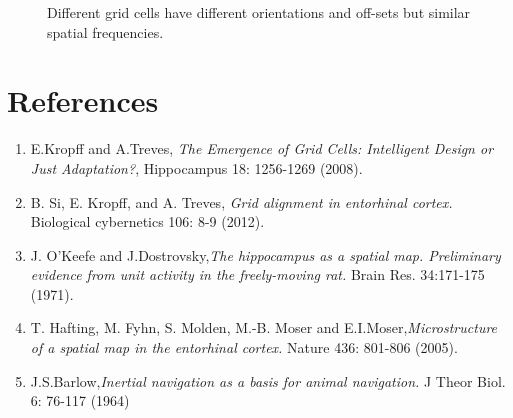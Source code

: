 \documentclass[a4paper, 12pt]{article}
\begin{document}
\begin{figure}
\hfill
{}
\hfill
{}
\hfill
\caption{Different grid cells have different orientations and off-sets but similar spatial frequencies.}
\label{diff}
\end{figure}
%
%
%

\newpage
\section{References}
\begin{enumerate}
\item E.Kropff and A.Treves, \textit{The Emergence of Grid Cells: Intelligent Design or Just Adaptation?}, Hippocampus 18: 1256-1269 (2008).

\item B. Si, E. Kropff, and A. Treves, \textit{Grid alignment in entorhinal cortex.} Biological cybernetics 106: 8-9 (2012).

\item J. O'Keefe and J.Dostrovsky,\textit{The hippocampus as a spatial map. Preliminary evidence from unit activity in the freely-moving rat.} Brain Res. 34:171-175 (1971). 

\item T. Hafting, M. Fyhn, S. Molden, M.-B. Moser and E.I.Moser,\textit{Microstructure of a spatial map in the entorhinal cortex.} Nature 436: 801-806 (2005).

\item J.S.Barlow,\textit{Inertial navigation as a basis for animal navigation.} J Theor Biol. 6:  76-117 (1964)
\end{enumerate}
\end{document}
